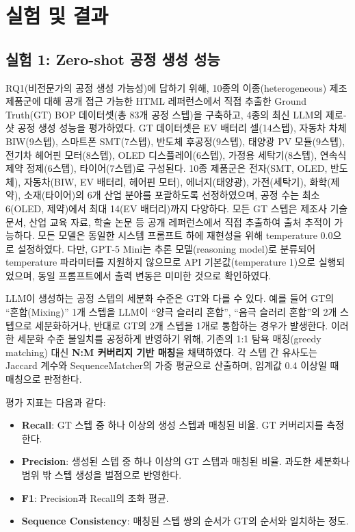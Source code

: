 \documentclass[conference]{IEEEtran}
\begin{document}
\section{실험 및 결과}

\subsection{실험 1: Zero-shot 공정 생성 성능}

RQ1(비전문가의 공정 생성 가능성)에 답하기 위해, 10종의 이종(heterogeneous) 제조 제품군에 대해 공개 접근 가능한 HTML 레퍼런스에서 직접 추출한 Ground Truth(GT) BOP 데이터셋(총 83개 공정 스텝)을 구축하고, 4종의 최신 LLM의 제로-샷 공정 생성 성능을 평가하였다. GT 데이터셋은 EV 배터리 셀(14스텝), 자동차 차체 BIW(9스텝), 스마트폰 SMT(7스텝), 반도체 후공정(9스텝), 태양광 PV 모듈(9스텝), 전기차 헤어핀 모터(8스텝), OLED 디스플레이(6스텝), 가정용 세탁기(8스텝), 연속식 제약 정제(6스텝), 타이어(7스텝)로 구성된다. 10종 제품군은 전자(SMT, OLED, 반도체), 자동차(BIW, EV 배터리, 헤어핀 모터), 에너지(태양광), 가전(세탁기), 화학(제약), 소재(타이어)의 6개 산업 분야를 포괄하도록 선정하였으며, 공정 수는 최소 6(OLED, 제약)에서 최대 14(EV 배터리)까지 다양하다. 모든 GT 스텝은 제조사 기술 문서, 산업 교육 자료, 학술 논문 등 공개 레퍼런스에서 직접 추출하여 출처 추적이 가능하다. 모든 모델은 동일한 시스템 프롬프트 하에 재현성을 위해 temperature 0.0으로 설정하였다. 다만, GPT-5 Mini는 추론 모델(reasoning model)로 분류되어 temperature 파라미터를 지원하지 않으므로 API 기본값(temperature 1)으로 실행되었으며, 동일 프롬프트에서 출력 변동은 미미한 것으로 확인하였다.

LLM이 생성하는 공정 스텝의 세분화 수준은 GT와 다를 수 있다. 예를 들어 GT의 ``혼합(Mixing)'' 1개 스텝을 LLM이 ``양극 슬러리 혼합'', ``음극 슬러리 혼합''의 2개 스텝으로 세분화하거나, 반대로 GT의 2개 스텝을 1개로 통합하는 경우가 발생한다. 이러한 세분화 수준 불일치를 공정하게 반영하기 위해, 기존의 1:1 탐욕 매칭(greedy matching) 대신 \textbf{N:M 커버리지 기반 매칭}을 채택하였다. 각 스텝 간 유사도는 Jaccard 계수와 SequenceMatcher의 가중 평균으로 산출하며, 임계값 0.4 이상일 때 매칭으로 판정한다.

평가 지표는 다음과 같다:
\begin{itemize}
\item \textbf{Recall}: GT 스텝 중 하나 이상의 생성 스텝과 매칭된 비율. GT 커버리지를 측정한다.
\item \textbf{Precision}: 생성된 스텝 중 하나 이상의 GT 스텝과 매칭된 비율. 과도한 세분화나 범위 밖 스텝 생성을 벌점으로 반영한다.
\item \textbf{F1}: Precision과 Recall의 조화 평균.
\item \textbf{Sequence Consistency}: 매칭된 스텝 쌍의 순서가 GT의 순서와 일치하는 정도.
\end{itemize}
\end{document}
